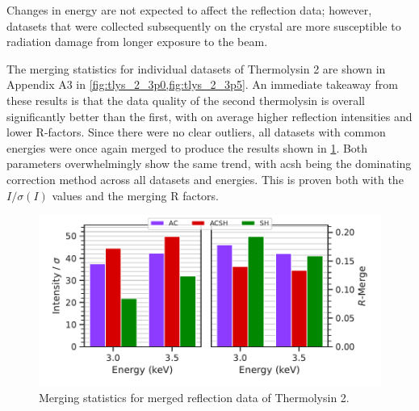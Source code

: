 Changes in energy are not expected to affect the reflection data; however, datasets that were collected subsequently on the crystal are more susceptible to radiation damage from longer exposure to the beam.%


The merging statistics for individual datasets of Thermolysin 2 are shown in Appendix A3 in \cref{fig:tlys_2_3p0,fig:tlys_2_3p5}. An immediate takeaway from these results is that the data quality of the second thermolysin is overall significantly better than the first, with on average higher reflection intensities and lower R-factors. Since there were no clear outliers, all datasets with common energies were once again merged to produce the results shown in \cref{fig:tlys_2_stats}. Both parameters overwhelmingly show the same trend, with \ac{acsh} being the dominating correction method across all datasets and energies. This is proven both with the $I/\sigma(I)$ values and the merging R factors.

\begin{figure}
    \centering
    \includegraphics{plots/exp1/tlys_2_P6122/merged_stats.pdf}
    \caption{Merging statistics for merged reflection data of Thermolysin 2.}
    \label{fig:tlys_2_stats}
\end{figure}


